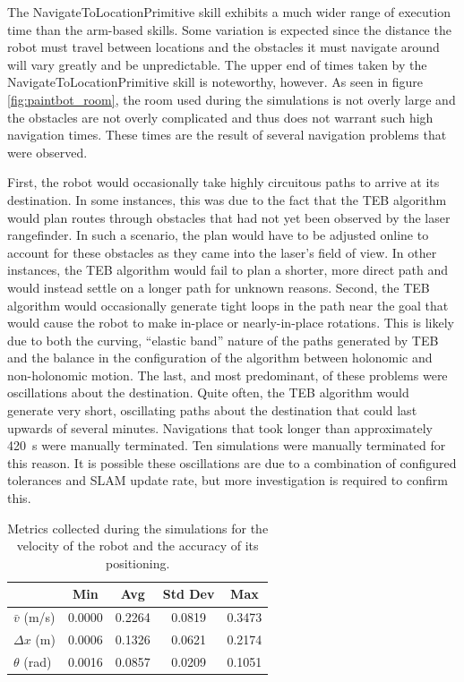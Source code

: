 The NavigateToLocationPrimitive skill exhibits a much wider range of execution time than the arm-based skills. Some variation is expected since the distance the robot must travel between locations and the obstacles it must navigate around will vary greatly and be unpredictable. The upper end of times taken by the NavigateToLocationPrimitive skill is noteworthy, however. As seen in figure \ref{fig:paintbot_room}, the room used during the simulations is not overly large and the obstacles are not overly complicated and thus does not warrant such high navigation times. These times are the result of several navigation problems that were observed.

First, the robot would occasionally take highly circuitous paths to arrive at its destination. In some instances, this was due to the fact that the TEB algorithm would plan routes through obstacles that had not yet been observed by the laser rangefinder. In such a scenario, the plan would have to be adjusted online to account for these obstacles as they came into the laser's field of view. In other instances, the TEB algorithm would fail to plan a shorter, more direct path and would instead settle on a longer path for unknown reasons. Second, the TEB algorithm would occasionally generate tight loops in the path near the goal that would cause the robot to make in-place or nearly-in-place rotations. This is likely due to both the curving, ``elastic band'' nature of the paths generated by TEB and the balance in the configuration of the algorithm between holonomic and non-holonomic motion. The last, and most predominant, of these problems were oscillations about the destination. Quite often, the TEB algorithm would generate very short, oscillating paths about the destination that could last upwards of several minutes. Navigations that took longer than approximately \SI{420}{\second} were manually terminated. Ten simulations were manually terminated for this reason. It is possible these oscillations are due to a combination of configured tolerances and SLAM update rate, but more investigation is required to confirm this.

\begin{table}
    \centering
    \begin{tabular}{|l|c c c c|}
        \hline
        & Min & Avg & Std Dev & Max \\
        \hline
        \hline
        $\bar{v}$ (m/s) & 0.0000 & 0.2264 & 0.0819 & 0.3473 \\
        \hline
        $\Delta x$ (m) & 0.0006 & 0.1326 & 0.0621 & 0.2174 \\
        \hline
        $\theta$ (rad) & 0.0016 & 0.0857 & 0.0209 & 0.1051 \\
        \hline
    \end{tabular}
    \caption{Metrics collected during the simulations for the velocity of the robot and the accuracy of its positioning.}
    \label{tbl:nav_metrics}
\end{table}

